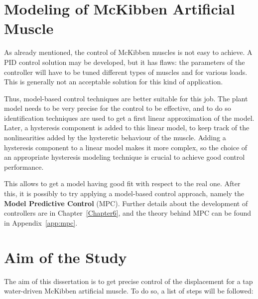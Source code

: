 \section{Modeling of McKibben Artificial Muscle}

As already mentioned, the control of McKibben muscles is not easy to achieve.
A PID control solution may be developed, but it has flaws:
the parameters of the controller will have to be tuned different types of muscles
and for various loads. 
This is generally not an acceptable solution for this kind of application.

Thus, model-based control techniques are better suitable for this job. The plant model
needs to be very precise for the control to be effective, and to do so identification techniques are used to get a first linear approximation of the model.
Later, a hysteresis component is added to this linear model, to keep track of the
nonlinearities added by the hysteretic behaviour of the muscle.
Adding a hysteresis component to a linear model makes it more complex, 
so the choice of an appropriate hysteresis modeling technique is crucial to achieve
good control performance.

This allows to get a model having good fit with respect to the real one.
After this, it is possibly to try applying a model-based control approach,
namely the \textbf{Model Predictive Control} (MPC).
Further details about the development of controllers are in Chapter~\ref{Chapter6},
and the theory behind MPC can be found in Appendix~\ref{app:mpc}.

\section{Aim of the Study}

The aim of this dissertation is to get precise control of the displacement for
a tap water-driven McKibben artificial muscle. To do so, a list of steps will be followed:

